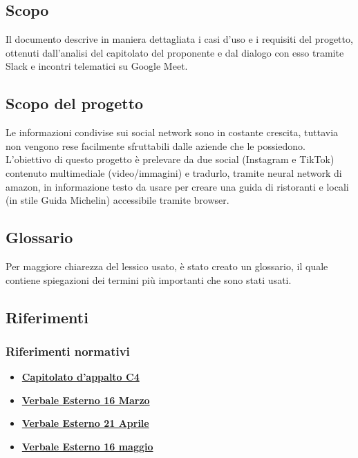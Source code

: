 \subsection{Scopo}
Il documento descrive in maniera dettagliata i casi d'uso e i requisiti del progetto, 
ottenuti dall'analisi del capitolato del proponente \proponente{} e dal dialogo con esso tramite Slack e incontri telematici su Google Meet.

\subsection{Scopo del progetto}
Le informazioni condivise sui social network sono in costante crescita, tuttavia 
non vengono rese facilmente sfruttabili dalle aziende che le possiedono. 
L'obiettivo di questo progetto è prelevare da due social (Instagram e TikTok) 
contenuto multimediale (video/immagini) e tradurlo, tramite neural network di 
amazon, in informazione testo da usare per creare una guida di ristoranti e locali
(in stile Guida Michelin) accessibile tramite browser. 

\subsection{Glossario}
Per maggiore chiarezza del lessico usato, è stato creato un glossario, il quale 
contiene spiegazioni dei termini più importanti che sono stati usati.

\subsection{Riferimenti}
\subsubsection{Riferimenti normativi}
\begin{itemize}
	\item
	\href{https://www.google.com/}{\textbf{Capitolato d'appalto C4}}
    \item
    \href{https://www.google.com/}{\textbf{Verbale Esterno 16 Marzo}}
    \item
	\href{https://www.google.com/}{\textbf{Verbale Esterno 21 Aprile}}
    \item
	\href{https://www.google.com/}{\textbf{Verbale Esterno 16 maggio}}

\end{itemize}
